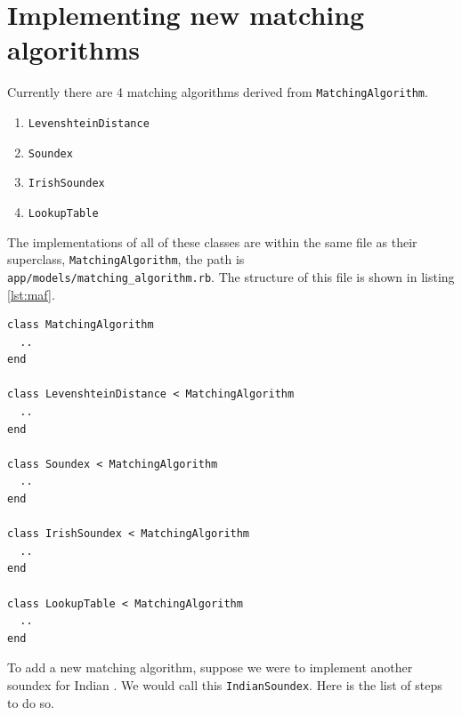\section{Implementing new matching algorithms}

Currently there are 4 matching algorithms derived from
\texttt{MatchingAlgorithm}.

\begin{enumerate}
  \item \texttt{LevenshteinDistance}
  \item \texttt{Soundex}
  \item \texttt{IrishSoundex}
  \item \texttt{LookupTable}
\end{enumerate}

The implementations of all of these classes are within the same file
as their superclass, \texttt{MatchingAlgorithm}, the path is\\
\texttt{app/models/matching\_algorithm.rb}. The structure of this file
is shown in listing \ref{lst:maf}.

\begin{minipage}{\linewidth}
  \begin{lstlisting}[label={lst:maf}, caption={\texttt{matching\_algorithm.rb}.}]
class MatchingAlgorithm
  ..
end

class LevenshteinDistance < MatchingAlgorithm
  ..
end

class Soundex < MatchingAlgorithm
  ..
end

class IrishSoundex < MatchingAlgorithm
  ..
end

class LookupTable < MatchingAlgorithm
  ..
end
\end{lstlisting}
\end{minipage}

To add a new matching algorithm, suppose we were to implement another
soundex for Indian \cite[]{indiansoundex}. We would call this \texttt{IndianSoundex}.
Here is the list of steps to do so.

